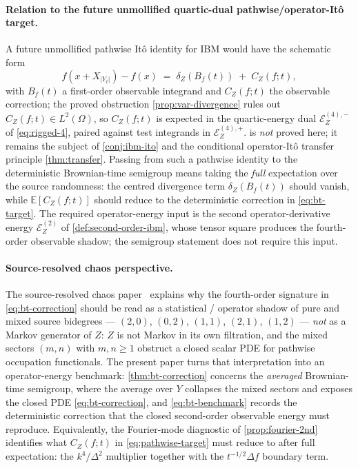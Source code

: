 \documentclass[11pt,reqno]{amsart}
\theoremstyle{plain}
\theoremstyle{definition}
\theoremstyle{remark}
\newcommand{\E}{\mathbb{E}}
\newcommand{\Energy}{\mathcal{E}}
\newcommand{\IBM}{Z}
\begin{document}
\paragraph{Relation to the future unmollified quartic-dual
pathwise/operator-It\^o target.}
A future unmollified pathwise It\^o identity for IBM would have the
schematic form
\begin{equation}\label{eq:pathwise-target}
  f(x+X_{|Y_t|})-f(x)
  \;=\;\delta_\IBM(B_f(t))\;+\;C_\IBM(f;t),
\end{equation}
with $B_f(t)$ a first-order observable integrand and $C_\IBM(f;t)$
the observable correction; the proved obstruction
\cref{prop:var-divergence} rules out $C_\IBM(f;t)\in L^{2}(\Omega)$,
so $C_\IBM(f;t)$ is expected in the quartic-energy dual
$\Energy_\IBM^{(4),-}$ of \eqref{eq:rigged-4}, paired against test
integrands in $\Energy_\IBM^{(4),+}$.  is
\emph{not} proved here; it remains the subject of
\cref{conj:ibm-ito} and the conditional operator-It\^o transfer
principle \cref{thm:transfer}. Passing from such a pathwise
identity to the deterministic Brownian-time semigroup means taking
the \emph{full} expectation over the source randomness: the centred
divergence term $\delta_\IBM(B_f(t))$ should vanish, while
$\E[C_\IBM(f;t)]$ should reduce to the deterministic correction in
\eqref{eq:bt-target}. The required operator-energy input is the
second operator-derivative energy $\Energy_\IBM^{(2)}$ of
\cref{def:second-order-ibm}, whose tensor square produces the
fourth-order observable shadow; the semigroup statement does not
require this input.

\paragraph{Source-resolved chaos perspective.}
The source-resolved chaos paper~\cite{Fontes-IBMchaos} explains why
the fourth-order signature in \eqref{eq:bt-correction} should be
read as a statistical / operator shadow of pure and mixed source
bidegrees --- $(2,0)$, $(0,2)$, $(1,1)$, $(2,1)$, $(1,2)$ ---
\emph{not} as a Markov generator of $\IBM$: $\IBM$ is not Markov in
its own filtration, and the mixed sectors $(m,n)$ with $m,n\ge 1$
obstruct a closed scalar PDE for pathwise occupation functionals.
The present paper turns that interpretation into an operator-energy
benchmark: \cref{thm:bt-correction} concerns the \emph{averaged}
Brownian-time semigroup, where the average over $Y$ collapses the
mixed sectors and exposes the closed PDE \eqref{eq:bt-correction},
and \eqref{eq:bt-benchmark} records the deterministic correction that
the closed second-order observable energy must reproduce. Equivalently,
the Fourier-mode diagnostic of \cref{prop:fourier-2nd} identifies what
$C_\IBM(f;t)$ in \eqref{eq:pathwise-target} must reduce to after full
expectation: the $k^{4}/\Delta^{2}$ multiplier together with the
$t^{-1/2}\Delta f$ boundary term.
\end{document}
